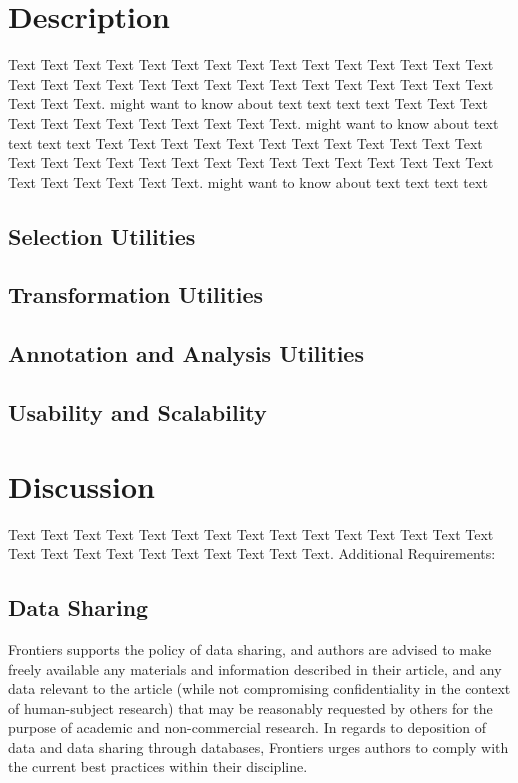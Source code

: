 \documentclass{frontiersSCNS} %
\begin{document}
\section{Description}

Text Text Text Text Text Text  Text Text Text Text Text Text Text Text Text  Text Text Text Text Text Text Text Text Text Text  Text Text Text Text Text Text  Text Text. might want to know about  text text text text Text Text Text Text  Text Text Text Text Text Text  Text Text.  might want to know about  text text text text
Text Text Text Text Text Text  Text Text Text Text Text Text Text Text Text  Text Text Text Text Text Text Text Text Text Text  Text Text Text Text Text Text  Text Text.  might want to know about  text text text text

\subsection{Selection Utilities}

\subsection{Transformation Utilities}


\subsection{Annotation and Analysis Utilities}
\subsection{Usability and Scalability}


\section{Discussion}

Text Text Text Text Text Text  Text Text Text Text Text Text Text Text Text  Text Text Text Text Text Text Text Text Text Text.
Additional Requirements:
\subsection{Data Sharing}

Frontiers supports the policy of data sharing, and authors are advised to make freely available any materials and information described in their article, and any data relevant to the article (while not compromising confidentiality in the context of human-subject research) that may be reasonably requested by others for the purpose of academic and non-commercial research. In regards to deposition of data and data sharing through databases, Frontiers urges authors to comply with the current best practices within their discipline.
\end{document}
